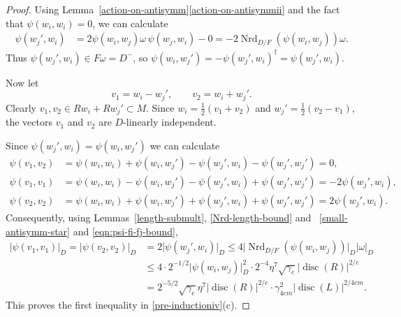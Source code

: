 \documentclass[11pt]{article}
\numberwithin{equation}{section}
\DeclareMathOperator{\disc}{disc}
\DeclareMathOperator{\Nrd}{Nrd}
\newcommand{\abs}[1]{\lvert #1 \rvert}
\begin{document}
\begin{proof}
Using Lemma~\ref{action-on-antisymm}\eqref{action-on-antisymmii} and the fact that $\psi(w_i, w_i) = 0$, we can calculate
\begin{align*}
\psi(w_j', w_i)
& = 2 \psi(w_i, w_j) \omega \, \psi(w_j, w_i) - 0
= -2 \Nrd_{D/F}(\psi(w_i, w_j))\omega.
\end{align*}
Thus $\psi(w_j', w_i) \in F\omega = D^-$, so $\psi(w_i, w_j') = -\psi(w_j', w_i)^\dag = \psi(w_j', w_i)$.

Now let
\[
v_1 = w_i - w_j', \qquad v_2 = w_i + w_j'.
\]
Clearly $v_1, v_2 \in Rw_i + Rw_j' \subset M$.
Since $w_i = \frac{1}{2}(v_1 + v_2)$ and $w_j' = \frac{1}{2}(v_2 - v_1)$, the vectors $v_1$ and $v_2$ are $D$-linearly independent.

Since $\psi(w_j', w_i) = \psi(w_i, w_j')$ we can calculate
\begin{align*}
\psi(v_1, v_2)
& = \psi(w_i, w_i) + \psi(w_i, w_j') - \psi(w_j', w_i) - \psi(w_j', w_j')
= 0,
\\ \psi(v_1, v_1)
& = \psi(w_i, w_i) - \psi(w_i, w_j') - \psi(w_j', w_i) + \psi(w_j', w_j')
= -2\psi(w_j', w_i),
\\ \psi(v_2, v_2)
& = \psi(w_i, w_i) + \psi(w_i, w_j') + \psi(w_j', w_i) + \psi(w_j', w_j')
= 2\psi(w_j', w_i).
\end{align*}
Consequently, using Lemmas~\ref{length-submult}, \ref{Nrd-length-bound} and~ \ref{small-antisymm-star} and \eqref{eqn:psi-fi-fj-bound},
\begin{align*}
\abs{\psi(v_1, v_1)}_D = \abs{\psi(v_2, v_2)}_D
& = 2\abs{\psi(w_j', w_i)}_D
\leq 4 \abs{\Nrd_{D/F}(\psi(w_i, w_j))}_D \abs{\omega}_D
\\& \leq 4 \cdot 2^{-1/2} \abs{\psi(w_i, w_j)}_D^2 \cdot 2^{-4} \eta^7 \sqrt{\gamma_e} \abs{\disc(R)}^{2/e}
\\& = 2^{-5/2} \sqrt{\gamma_e} \eta^7 \abs{\disc(R)}^{2/e} \cdot \gamma_{4em}^2 \abs{\disc(L)}^{2/4em}.
\end{align*}
This proves the first inequality in \eqref{pre-inductioniv}(c).


\end{proof}
\end{document}
